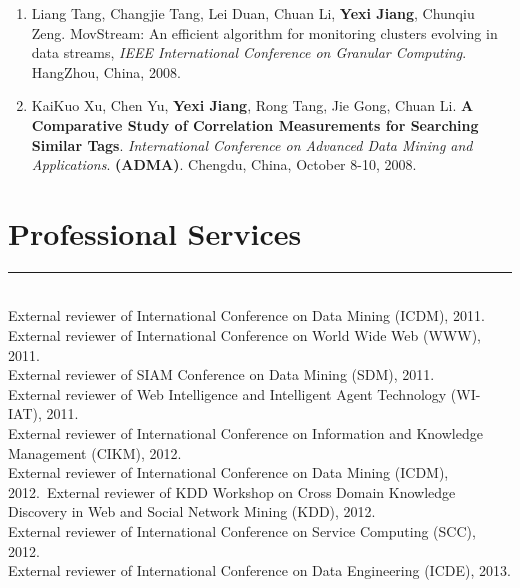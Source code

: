 \documentclass{res}
\begin{document}
\begin{resume}
\begin{enumerate}
        \item Liang Tang, Changjie Tang, Lei Duan, Chuan Li, \textbf{Yexi Jiang}, Chunqiu Zeng. MovStream: An efficient algorithm for monitoring clusters evolving in data streams, \textit{IEEE International Conference on Granular Computing}. HangZhou, China, 2008.
        \item KaiKuo Xu, Chen Yu, \textbf{Yexi Jiang}, Rong Tang, Jie Gong, Chuan Li. \textbf{A Comparative Study of Correlation Measurements for Searching Similar Tags}. \textit{International Conference on Advanced Data Mining and Applications}. \textbf{(ADMA)}. Chengdu, China, October 8-10, 2008.
    \end{enumerate}

\section{\bfseries\Large Professional Services}
\hspace{-0.5in}\rule{16.8cm}{0.4pt}\\
External reviewer of International Conference on Data Mining (ICDM), 2011.\\
External reviewer of International Conference on World Wide Web (WWW), 2011.\\
External reviewer of SIAM Conference on Data Mining (SDM), 2011.\\
External reviewer of Web Intelligence and Intelligent Agent Technology (WI-IAT), 2011.\\
External reviewer of International Conference on Information and Knowledge Management (CIKM), 2012.	\\
External reviewer of International Conference on Data Mining (ICDM), 2012.\	 
External reviewer of KDD Workshop on Cross Domain Knowledge Discovery in Web and Social Network Mining (KDD), 2012.	\\
External reviewer of International Conference on Service Computing (SCC), 2012.	\\
External reviewer of International Conference on Data Engineering (ICDE), 2013.	\\


\end{resume}
\end{document}
